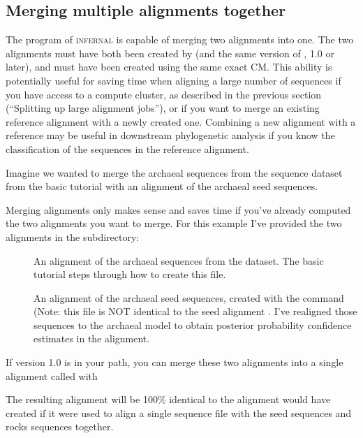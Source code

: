 \subsection{Merging multiple alignments together}

The  program of \textsc{infernal} is capable of merging
two alignments into one. The two alignments must have both been created by
 (and the same version of , 1.0 or later),
and must have been created using the same exact CM. This ability is
potentially useful for saving time when aligning a large number of
sequences if you have access to a compute cluster, as described in the
previous section (``Splitting up large alignment jobs''), or if you
want to merge an existing reference alignment with a newly created
one. Combining a new alignment with a reference may be useful in
downstream phylogenetic analysis if you know the classification of the
sequences in the reference alignment.

Imagine we wanted to merge the archaeal sequences from the
 sequence dataset from the basic tutorial with 
an alignment of the archaeal seed sequences. 

Merging alignments only makes sense and saves time if you've already
computed the two alignments you want to merge. For this example I've
provided the two alignments in the  subdirectory:

\begin{description}
\item[]
  An alignment of the archaeal sequences from the 
  dataset. The basic tutorial steps through how to create this file.

\item[]
  An alignment of the archaeal seed sequences, created with the
  command 
  (Note: this file is NOT identical to the seed alignment
  . I've realigned those sequences to the
  archaeal model to obtain posterior probability confidence estimates
  in the alignment. 
\end{description}

If  version 1.0 is in your path, you 
can merge these two alignments into a single alignment called
 with


The resulting alignment will be 100\% identical to the alignment
 would have created if it were used to align a single
sequence file with the seed sequences and rocks sequences together.
